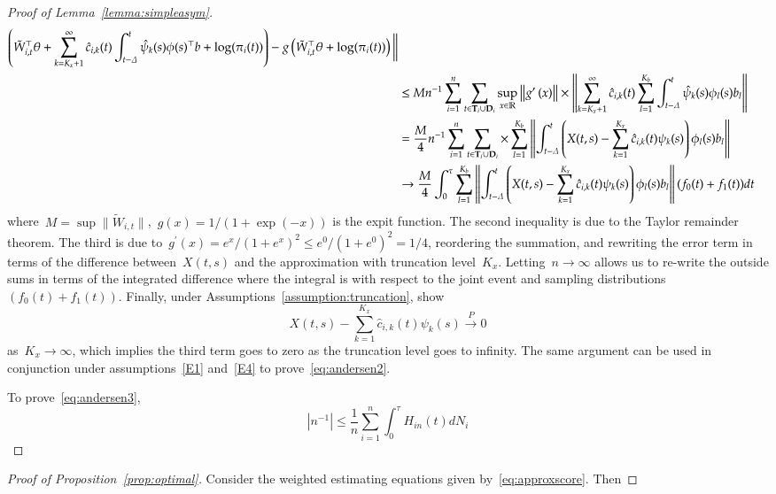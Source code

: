 \documentclass[12pt]{amsart}
\def\bfT{{\bf T}}
\def\bfD{{\bf D}}
\begin{document}
\begin{proof}[Proof of Lemma~\ref{lemma:simpleasym}]
\begin{align*}
         \left( \tilde W_{i,t}^\top \theta  + \sum_{k=K_x+1}^\infty \hat
         c_{i,k} (t) \int_{t-\Delta}^t \hat \psi_k (s) \phi (s)^\top b
         + \log (\pi_i (t) ) \right) - g \left( \tilde W_{i,t}^\top
         \theta + \log (\pi_i (t)) \right) \bigg \| \\
&\leq M n^{-1} \sum_{i=1}^n \sum_{t \in \bfT_i \cup \bfD_i}
    \sup_{x \in \mathbb{R}} \left \| g^\prime \left( x \right)
  \right\| \times \left \| \sum_{k=K_x+1}^\infty \hat c_{i,k} (t)
  \sum_{l=1}^{K_b} \int_{t-\Delta}^t \hat \psi_k (s) \phi_l (s) b_l
  \right \| \\
&= \frac{M}{4} n^{-1} \sum_{i=1}^n \sum_{t \in \bfT_i \cup \bfD_i}
  \times \sum_{l=1}^{K_b} \left \| \int_{t-\Delta}^t
  \left( X(t,s) - \sum_{k=1}^{K_x} \hat c_{i,k} (t) \psi_k (s) \right)
  \phi_l (s) b_l\right \| \\
&\to \frac{M}{4} \int_0^\tau \sum_{l=1}^{K_b} \left \| \int_{t-\Delta}^t
  \left( X(t,s) - \sum_{k=1}^{K_x} \hat c_{i,k} (t) \psi_k (s) \right)
  \phi_l (s) b_l\right \| (f_0(t) + f_1(t)) dt
\end{align*}
where~$M = \sup \| \tilde W_{i,t} \|$,~$g(x) = 1/(1+\exp(-x))$ is the
expit function.
The second inequality is due to the Taylor remainder theorem. The third is due to~$g^\prime (x) = e^x/(1+e^x)^2 \leq e^0/(1+e^0)^2 = 1/4$, reordering the summation, and rewriting the error term in terms of the difference between~$X(t,s)$ and the approximation with truncation level~$K_x$. Letting~$n \to \infty$ allows us to re-write the outside sums in terms of the integrated difference where the integral is with respect to the joint event and sampling distributions~$(f_0(t) + f_1 (t))$. Finally, under Assumptions~\ref{assumption:truncation}, \cite{Park2018} show
\[
X(t,s) - \sum_{k=1}^{K_x} \hat c_{i,k} (t) \psi_k (s) \overset{P}{\to} 0
\]
as~$K_x \to \infty$, which implies the third term goes to zero as the truncation level goes to infinity. The same argument can be used in conjunction under assumptions~\ref{E1} and~\ref{E4} to prove~\eqref{eq:andersen2}.

To prove~\eqref{eq:andersen3},
\[
\left | n^{-1}  \right | \leq \frac{1}{n} \sum_{i=1}^n \int_0^\tau H_{in} (t) dN_i
\]
\end{proof}

\begin{proof}[Proof of Proposition~\ref{prop:optimal}]
Consider the weighted estimating equations given by~\eqref{eq:approxscore}.
Then
\end{proof}
\end{document}
